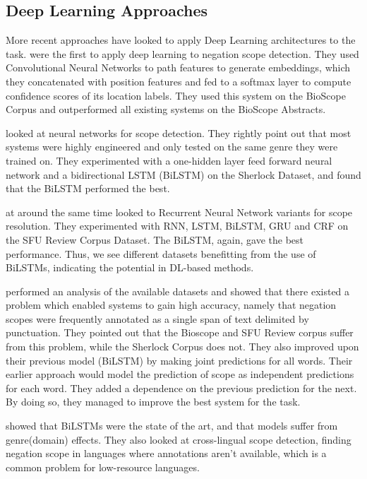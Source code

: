\documentclass[10pt, a4paper]{article}
\begin{document}
\subsection{Deep Learning Approaches}
More recent approaches have looked to apply Deep Learning architectures to the task.   were the first to apply deep learning to negation scope detection. They used Convolutional Neural Networks to path features to generate embeddings, which they concatenated with position features and fed to a softmax layer to compute confidence scores of its location labels. They used this system on the BioScope Corpus and outperformed all existing systems on the BioScope Abstracts.
\par {} looked at neural networks for scope detection. They rightly point out that most systems were highly engineered and only tested on the same genre they were trained on. They experimented with a one-hidden layer feed forward neural network and a bidirectional LSTM (BiLSTM) on the Sherlock Dataset, and found that the BiLSTM performed the best.
\par {} at around the same time looked to Recurrent Neural Network variants for scope resolution. They experimented with RNN, LSTM, BiLSTM, GRU and CRF on the SFU Review Corpus Dataset. The BiLSTM, again, gave the best performance. Thus, we see different datasets benefitting from the use of BiLSTMs, indicating the potential in DL-based methods.
\par {} performed an analysis of the available datasets and showed that there existed a problem which enabled systems to gain high accuracy, namely that negation scopes were frequently annotated as a single span of text delimited by punctuation. They pointed out that the Bioscope and SFU Review corpus suffer from this problem, while the Sherlock Corpus does not. They also improved upon their previous model \cite{fancellu-etal-2016-neural} (BiLSTM) by making joint predictions for all words. Their earlier approach would model the prediction of scope as independent predictions for each word. They added a dependence on the previous prediction for the next. By doing so, they managed to improve the best system for the task.
\par {} showed that BiLSTMs were the state of the art, and that models suffer from genre(domain) effects. They also looked at cross-lingual scope detection, finding negation scope in languages where annotations aren’t available, which is a common problem for low-resource languages.
\end{document}
